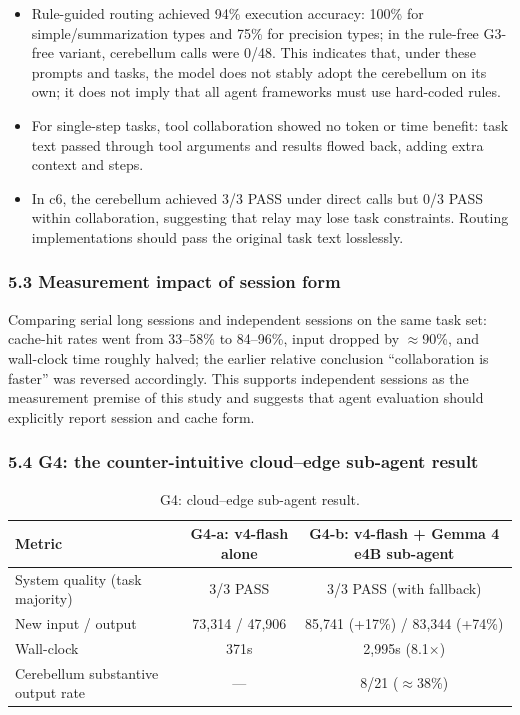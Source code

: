 \documentclass[
]{article}
\begin{document}
\begin{itemize}
\item Rule-guided routing achieved 94\% execution accuracy: 100\% for simple/summarization types and 75\% for precision types; in the rule-free G3-free variant, cerebellum calls were 0/48. This indicates that, under these prompts and tasks, the model does not stably adopt the cerebellum on its own; it does not imply that all agent frameworks must use hard-coded rules.
\item For single-step tasks, tool collaboration showed no token or time benefit: task text passed through tool arguments and results flowed back, adding extra context and steps.
\item In c6, the cerebellum achieved 3/3 PASS under direct calls but 0/3 PASS within collaboration, suggesting that relay may lose task constraints. Routing implementations should pass the original task text losslessly.
\end{itemize}

\subsubsection{5.3 Measurement impact of session form}
Comparing serial long sessions and independent sessions on the same task set: cache-hit rates went from 33--58\% to 84--96\%, input dropped by $\approx$90\%, and wall-clock time roughly halved; the earlier relative conclusion ``collaboration is faster'' was reversed accordingly. This supports independent sessions as the measurement premise of this study and suggests that agent evaluation should explicitly report session and cache form.

\subsubsection{5.4 G4: the counter-intuitive cloud--edge sub-agent result}
\begin{table}[ht]
\centering
\small
\begin{tabular}{lcc}
\toprule
Metric & G4-a: v4-flash alone & G4-b: v4-flash + Gemma 4 e4B sub-agent \\
\midrule
System quality (task majority) & 3/3 PASS & 3/3 PASS (with fallback) \\
New input / output & 73,314 / 47,906 & 85,741 (+17\%) / 83,344 (+74\%) \\
Wall-clock & 371s & 2,995s (8.1$\times$) \\
Cerebellum substantive output rate & --- & 8/21 ($\approx$38\%) \\
\bottomrule
\end{tabular}
\caption{G4: cloud--edge sub-agent result.}
\label{tab:g4}
\end{table}
\end{document}
